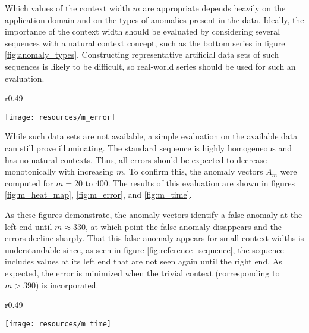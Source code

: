 Which values of the context width $m$ are appropriate depends heavily on the application domain and on the types of anomalies present in the data. Ideally, the importance of the context width should be evaluated by considering several sequences with a natural context concept, such as the bottom series in figure \ref{fig:anomaly_types}. Constructing representative artificial data sets of such sequences is likely to be difficult, so real-world series should be used for such an evaluation.

\begin{wrapfigure}{r}{0.49\textwidth} \vspace{-20pt}
    \vspace{-10pt}
    \begin{center}
        \texttt{[image: resources/m\_error]}
    \end{center}
    \vspace{-20pt}
    \caption{\small{Errors of the anomaly vectors $A_m$.}}
    \vspace{-20pt}
    \label{fig:m_error}
\end{wrapfigure}

While such data sets are not available, a simple evaluation on the available data can still prove illuminating. The standard sequence is highly homogeneous and has no natural contexts. Thus, all errors should be expected to decrease monotonically with increasing $m$. To confirm this, the anomaly vectors $A_m$ were computed for $m = 20$ to $400$. The results of this evaluation are shown in figures \ref{fig:m_heat_map}, \ref{fig:m_error}, and \ref{fig:m_time}. 

As these figures demonstrate, the anomaly vectors identify a false anomaly at the left end until $m \approx 330$, at which point the false anomaly disappears and the errors decline sharply. That this false anomaly appears for small context widths is understandable since, as seen in figure \ref{fig:reference_sequence}, the sequence includes values at its left end that are not seen again until the right end. As expected, the error is minimized when the trivial context (corresponding to $m > 390$) is incorporated.

\begin{wrapfigure}{r}{0.49\textwidth}
    \vspace{-30pt}
    \begin{center}
        \texttt{[image: resources/m\_time]}
    \end{center}
    \vspace{-20pt}
    \caption{\small{Evaluation times of the anomaly vectors $A_m$.}}
    \vspace{-20pt}
    \label{fig:m_time}
\end{wrapfigure}

